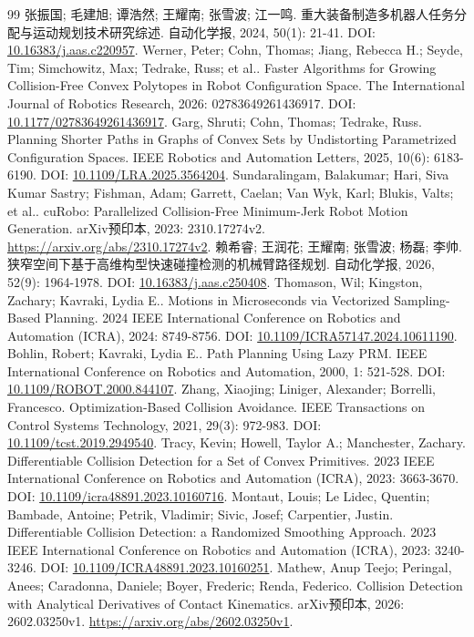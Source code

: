 \documentclass{aas}
\begin{document}
\begin{thebibliography}{99}
 张振国; 毛建旭; 谭浩然; 王耀南; 张雪波; 江一鸣. 重大装备制造多机器人任务分配与运动规划技术研究综述. 自动化学报, 2024, 50(1): 21-41. DOI: \url{10.16383/j.aas.c220957}.
 Werner, Peter; Cohn, Thomas; Jiang, Rebecca H.; Seyde, Tim; Simchowitz, Max; Tedrake, Russ; et al.. Faster Algorithms for Growing Collision-Free Convex Polytopes in Robot Configuration Space. The International Journal of Robotics Research, 2026: 02783649261436917. DOI: \url{10.1177/02783649261436917}.
 Garg, Shruti; Cohn, Thomas; Tedrake, Russ. Planning Shorter Paths in Graphs of Convex Sets by Undistorting Parametrized Configuration Spaces. IEEE Robotics and Automation Letters, 2025, 10(6): 6183-6190. DOI: \url{10.1109/LRA.2025.3564204}.
 Sundaralingam, Balakumar; Hari, Siva Kumar Sastry; Fishman, Adam; Garrett, Caelan; Van Wyk, Karl; Blukis, Valts; et al.. cuRobo: Parallelized Collision-Free Minimum-Jerk Robot Motion Generation. arXiv预印本, 2023: 2310.17274v2. \url{https://arxiv.org/abs/2310.17274v2}.
 赖希睿; 王润花; 王耀南; 张雪波; 杨磊; 李帅. 狭窄空间下基于高维构型快速碰撞检测的机械臂路径规划. 自动化学报, 2026, 52(9): 1964-1978. DOI: \url{10.16383/j.aas.c250408}.
 Thomason, Wil; Kingston, Zachary; Kavraki, Lydia E.. Motions in Microseconds via Vectorized Sampling-Based Planning. 2024 IEEE International Conference on Robotics and Automation (ICRA), 2024: 8749-8756. DOI: \url{10.1109/ICRA57147.2024.10611190}.
 Bohlin, Robert; Kavraki, Lydia E.. Path Planning Using Lazy PRM. IEEE International Conference on Robotics and Automation, 2000, 1: 521-528. DOI: \url{10.1109/ROBOT.2000.844107}.
 Zhang, Xiaojing; Liniger, Alexander; Borrelli, Francesco. Optimization-Based Collision Avoidance. IEEE Transactions on Control Systems Technology, 2021, 29(3): 972-983. DOI: \url{10.1109/tcst.2019.2949540}.
 Tracy, Kevin; Howell, Taylor A.; Manchester, Zachary. Differentiable Collision Detection for a Set of Convex Primitives. 2023 IEEE International Conference on Robotics and Automation (ICRA), 2023: 3663-3670. DOI: \url{10.1109/icra48891.2023.10160716}.
 Montaut, Louis; Le Lidec, Quentin; Bambade, Antoine; Petrik, Vladimir; Sivic, Josef; Carpentier, Justin. Differentiable Collision Detection: a Randomized Smoothing Approach. 2023 IEEE International Conference on Robotics and Automation (ICRA), 2023: 3240-3246. DOI: \url{10.1109/ICRA48891.2023.10160251}.
 Mathew, Anup Teejo; Peringal, Anees; Caradonna, Daniele; Boyer, Frederic; Renda, Federico. Collision Detection with Analytical Derivatives of Contact Kinematics. arXiv预印本, 2026: 2602.03250v1. \url{https://arxiv.org/abs/2602.03250v1}.

\end{thebibliography}
\end{document}
